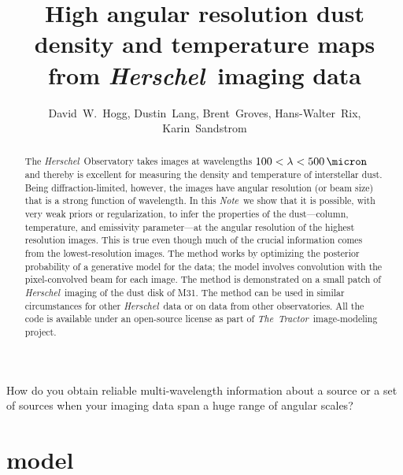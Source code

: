 \documentclass[12pt,pdftex,preprint]{aastex}
\newcommand{\documentname}{\textsl{Note}}
\newcommand{\project}[1]{\textsl{#1}}
\newcommand{\TheTractor}{\project{The~Tractor}}
\newcommand{\Herschel}{\project{Herschel}}
\begin{document}
\title{High angular resolution dust density and temperature maps from \Herschel\ imaging data}
\author{
  David~W.~Hogg,
  Dustin~Lang,
  Brent~Groves,
  Hans-Walter~Rix,
  Karin~Sandstrom}

\begin{abstract}
The \Herschel\ Observatory takes images at wavelengths
$100<\lambda<500\,\micron$ and thereby is excellent for measuring the
density and temperature of interstellar dust.  Being
diffraction-limited, however, the images have angular resolution (or
beam size) that is a strong function of wavelength.  In this
\documentname\ we show that it is possible, with very weak priors or
regularization, to infer the properties of the dust---column,
temperature, and emissivity parameter---at the angular resolution of
the highest resolution images.  This is true even though much of the
crucial information comes from the lowest-resolution images.  The
method works by optimizing the posterior probability of a generative
model for the data; the model involves convolution with the
pixel-convolved beam for each image.  The method is demonstrated on a
small patch of \Herschel\ imaging of the dust disk of M31.  The method
can be used in similar circumstances for other \Herschel\ data or on
data from other observatories.  All the code is available under an
open-source license as part of \TheTractor\ image-modeling project.
\end{abstract}

How do you obtain reliable multi-wavelength information about a source
or a set of sources when your imaging data span a huge range of
angular scales?

\section{model}
\end{document}

